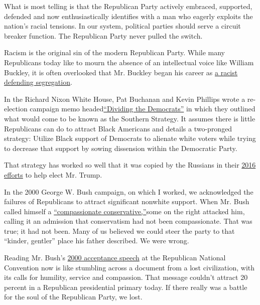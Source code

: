 What is most telling is that the Republican Party actively embraced,
supported, defended and now enthusiastically identifies with a man who
eagerly exploits the nation's racial tensions. In our system, political
parties should serve a circuit breaker function. The Republican Party
never pulled the switch.

Racism is the original sin of the modern Republican Party. While many
Republicans today like to mourn the absence of an intellectual voice
like William Buckley, it is often overlooked that Mr. Buckley began his
career as
\href{https://www.politico.com/magazine/story/2017/05/13/william-f-buckley-civil-rights-215129}{a
racist defending segregation}.

In the Richard Nixon White House, Pat Buchanan and Kevin Phillips wrote
a re-election campaign memo
headed\href{https://www.cnn.com/2010/POLITICS/01/11/nixon.racial.strategy/index.html}{``Dividing
the Democrats''} in which they outlined what would come to be known as
the Southern Strategy. It assumes there is little Republicans can do to
attract Black Americans and details a two-pronged strategy: Utilize
Black support of Democrats to alienate white voters while trying to
decrease that support by sowing dissension within the Democratic Party.

That strategy has worked so well that it was copied by the Russians in
their
\href{https://www.nytimes3xbfgragh.onion/2019/04/18/us/politics/the-mueller-report-excerpts.html}{2016
efforts} to help elect Mr. Trump.

In the 2000 George W. Bush campaign, on which I worked, we acknowledged
the failures of Republicans to attract significant nonwhite support.
When Mr. Bush called himself a
\href{https://www.nytimes3xbfgragh.onion/2000/06/12/us/bush-draws-campaign-theme-from-more-than-the-heart.html}{``compassionate
conservative,''}some on the right attacked him, calling it an admission
that conservatism had not been compassionate. That was true; it had not
been. Many of us believed we could steer the party to that ``kinder,
gentler'' place his father described. We were wrong.

Reading Mr. Bush's
\href{http://movies2.nytimes3xbfgragh.onion/library/politics/camp/080400wh-bush-speech.html}{2000
acceptance speech} at the Republican National Convention now is like
stumbling across a document from a lost civilization, with its calls for
humility, service and compassion. That message couldn't attract 20
percent in a Republican presidential primary today. If there really was
a battle for the soul of the Republican Party, we lost.

